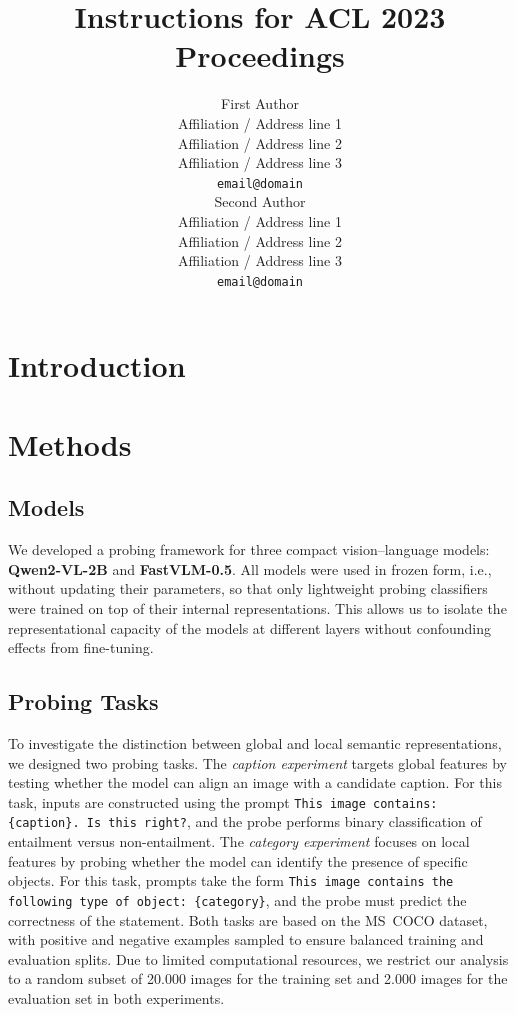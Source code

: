 \documentclass[11pt]{article}
\title{Instructions for ACL 2023 Proceedings}
\author{First Author \\
  Affiliation / Address line 1 \\
  Affiliation / Address line 2 \\
  Affiliation / Address line 3 \\
  \texttt{email@domain} \\\And
  Second Author \\
  Affiliation / Address line 1 \\
  Affiliation / Address line 2 \\
  Affiliation / Address line 3 \\
  \texttt{email@domain} \\}
\begin{document}
\maketitle
\begin{abstract}

\end{abstract}

\section{Introduction}
\section{Methods}

\subsection{Models}
We developed a probing framework for three compact vision--language models:
\textbf{Qwen2-VL-2B} and \textbf{FastVLM-0.5}.
All models were used in frozen form, i.e., without updating their parameters,
so that only lightweight probing classifiers were trained on top of their internal
representations. This allows us to isolate the representational capacity of the models
at different layers without confounding effects from fine-tuning.

\subsection{Probing Tasks}
To investigate the distinction between global and local semantic representations,
we designed two probing tasks. The \emph{caption experiment} targets global features
by testing whether the model can align an image with a candidate caption.
For this task, inputs are constructed using the prompt
\texttt{This image contains: \{caption\}. Is this right?},
and the probe performs binary classification of entailment versus non-entailment.
The \emph{category experiment} focuses on local features by probing whether the model
can identify the presence of specific objects. For this task, prompts take the form
\texttt{This image contains the following type of object: \{category\}},
and the probe must predict the correctness of the statement. Both tasks are based
on the MS~COCO dataset, with positive and negative examples sampled to ensure balanced
training and evaluation splits. Due to limited computational resources, we restrict our analysis to a random subset of 20.000 images for the training set and 2.000 images for the evaluation set in both experiments.
\end{document}

